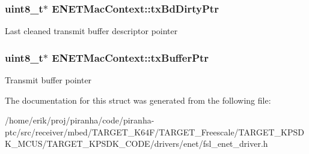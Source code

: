 \subsubsection[{\texorpdfstring{tx\+Bd\+Dirty\+Ptr}{txBdDirtyPtr}}]{\setlength{\rightskip}{0pt plus 5cm}uint8\+\_\+t$\ast$ E\+N\+E\+T\+Mac\+Context\+::tx\+Bd\+Dirty\+Ptr}\hypertarget{structENETMacContext_aef7d23d7e944f9d916fc272c88b1189b}{}\label{structENETMacContext_aef7d23d7e944f9d916fc272c88b1189b}
Last cleaned transmit buffer descriptor pointer 
\subsubsection[{\texorpdfstring{tx\+Buffer\+Ptr}{txBufferPtr}}]{\setlength{\rightskip}{0pt plus 5cm}uint8\+\_\+t$\ast$ E\+N\+E\+T\+Mac\+Context\+::tx\+Buffer\+Ptr}\hypertarget{structENETMacContext_a4ef76663fb63a619dfea2b2269ce444f}{}\label{structENETMacContext_a4ef76663fb63a619dfea2b2269ce444f}
Transmit buffer pointer 

The documentation for this struct was generated from the following file\+:\begin{DoxyCompactItemize}
\item 
/home/erik/proj/piranha/code/piranha-\/ptc/src/receiver/mbed/\+T\+A\+R\+G\+E\+T\+\_\+\+K64\+F/\+T\+A\+R\+G\+E\+T\+\_\+\+Freescale/\+T\+A\+R\+G\+E\+T\+\_\+\+K\+P\+S\+D\+K\+\_\+\+M\+C\+U\+S/\+T\+A\+R\+G\+E\+T\+\_\+\+K\+P\+S\+D\+K\+\_\+\+C\+O\+D\+E/drivers/enet/fsl\+\_\+enet\+\_\+driver.\+h\end{DoxyCompactItemize}
